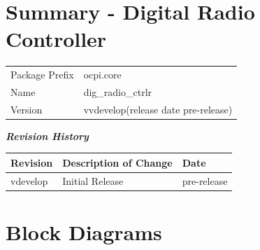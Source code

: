 \documentclass{article}
\author{} %
\date{Version \docVersion} %
\title{\docTitle}
\def\docVersion{\color{red}vdevelop}
\def\comp{dig\_radio\_ctrlr}
\def\Comp{Digital Radio Controller}
\begin{document}
\section*{Summary - \Comp}
\begin{longtable}{|p{3cm}|p{13.84cm}|}
	\hline
	\rowcolor{blue}
	                  &                                        \\
	\hline
	Package Prefix    & ocpi.core \\
	\hline
	Name              & \comp                                  \\
	\hline
	Version           & v\docVersion (release date \color{red}pre-release) \\
	\hline
\end{longtable}

\begin{center}
  \textit{\textbf{Revision History}}
  \begin{longtable}{|p{2cm}|p{12cm}|p{2.4cm}|}
    \hline
    \rowcolor{blue}
    \textbf{Revision} & \textbf{Description of Change} & \textbf{Date} \\
    \hline
    \color{red}vdevelop & Initial Release & \color{red}pre-release \\
    \hline
  \end{longtable}
\end{center}

\section{Block Diagrams}
\end{document}
